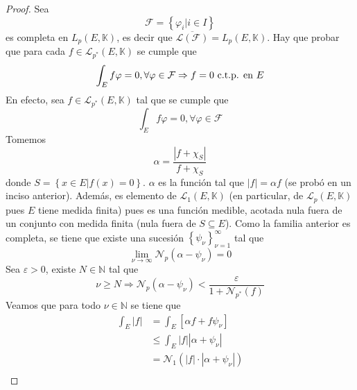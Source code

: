 \documentclass[12pt]{report}
\newcounter{it}
\theoremstyle{largebreak}
\newcommand\abs[1]{\ensuremath{\left|#1\right|}}
\newcommand{\N}[2]{\ensuremath{\mathcal{N}_{#1}\left(#2\right)}}
\begin{document}
    \begin{proof}
        Sea
        \begin{equation*}
            \mathcal{F}=\left\{\varphi_i\Big|i\in I \right\}
        \end{equation*}
        es completa en $L_p(E,\mathbb{K})$, es decir que $\overline{\mathcal{L}(\mathcal{F})}=L_p(E,\mathbb{K})$. Hay que probar que para cada $f\in\mathcal{L}_{ p^*}(E,\mathbb{K})$ se cumple que
        \begin{equation*}
            \int_E f\varphi=0,\forall\varphi\in\mathcal{F} \Rightarrow f=0\textup{ c.t.p. en }E
        \end{equation*}
        En efecto, sea $f\in\mathcal{L}_{ p^*}(E,\mathbb{K})$ tal que se cumple que
        \begin{equation*}
            \int_E f\varphi=0,\forall\varphi\in\mathcal{F}
        \end{equation*}
        Tomemos
        \begin{equation*}
            \alpha=\frac{\abs{f+\chi_S}}{f+\chi_S}
        \end{equation*}
        donde $S=\left\{x\in E\Big|f(x)=0\right\}$. $\alpha$ es la función tal que $\abs{f}=\alpha f$ (se probó en un inciso anterior). Además, es elemento de $\mathcal{L}_1(E,\mathbb{K})$ (en particular, de $\mathcal{L}_p(E,\mathbb{K})$ pues $E$ tiene medida finita) pues es una función medible, acotada nula fuera de un conjunto con medida finita (nula fuera de $S\subseteq E$). Como la familia anterior es completa, se tiene que existe una sucesión $\left\{\psi_\nu \right\}_{ \nu=1}^\infty$ tal que
        \begin{equation*}
            \lim_{ \nu\rightarrow\infty}\N{p}{\alpha-\psi_\nu}=0
        \end{equation*}
        Sea $\varepsilon>0$, existe $N\in\mathbb{N}$ tal que
        \begin{equation*}
            \nu\geq N\Rightarrow \N{p}{\alpha-\psi_\nu}<\frac{\varepsilon}{1+\N{p^*}{f}}
        \end{equation*}
        Veamos que para todo $\nu\in\mathbb{N}$ se tiene que
        \begin{equation*}
            \begin{split}
                \int_E\abs{f}&=\int_E\left[\alpha f+f\psi_\nu\right]\\
                &\leq\int_E\abs{f}\abs{\alpha+\psi_\nu}\\
                &=\N{1}{\abs{f}\cdot\abs{\alpha+\psi_\nu}}\\

\end{split}
\end{equation*}
\end{proof}
\end{document}
